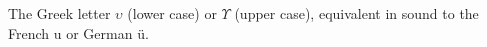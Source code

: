 The Greek letter $ \upsilon $ (lower case) or $ \Upsilon $ (upper case),
equivalent in sound to the French u or German \"u.